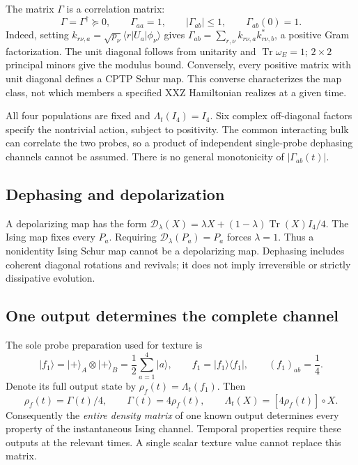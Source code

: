 \documentclass[11pt,a4paper]{article}
\newcommand{\ket}[1]{\lvert #1\rangle}
\newcommand{\bra}[1]{\langle #1\rvert}
\newcommand{\Tr}{\operatorname{Tr}}
\begin{document}
The matrix $\Gamma$ is a correlation matrix:
\begin{equation}
 \Gamma=\Gamma^\dagger\succeq0,\qquad \Gamma_{aa}=1,
 \qquad |\Gamma_{ab}|\le1,\qquad \Gamma_{ab}(0)=1.
 \label{eq:correlation}
\end{equation}
Indeed, setting $k_{r\nu,a}=\sqrt{p_\nu}\bra rU_a\ket{\phi_\nu}$
gives $\Gamma_{ab}=\sum_{r,\nu}k_{r\nu,a}k_{r\nu,b}^*$, a positive
Gram factorization. The unit diagonal follows from unitarity and
$\Tr\omega_E=1$; $2\times2$ principal minors give the modulus bound.
Conversely, every positive matrix with unit diagonal defines a CPTP
Schur map. This converse characterizes the map class, not which members
a specified XXZ Hamiltonian realizes at a given time.

All four populations are fixed and $\Lambda_t(I_4)=I_4$. Six complex
off-diagonal factors specify the nontrivial action, subject to positivity.
The common interacting bulk can correlate the two probes, so a product
of independent single-probe dephasing channels cannot be assumed.
There is no general monotonicity of $|\Gamma_{ab}(t)|$.

\subsection{Dephasing and depolarization}\label{sec:depolarizing}

A depolarizing map has the form
$\mathcal D_\lambda(X)=\lambda X+(1-\lambda)\Tr(X)I_4/4$.
The Ising map fixes every $P_a$. Requiring
$\mathcal D_\lambda(P_a)=P_a$ forces $\lambda=1$.
Thus a nonidentity Ising Schur map cannot be a depolarizing map.
Dephasing includes coherent diagonal rotations and revivals; it does
not imply irreversible or strictly dissipative evolution.

\subsection{One output determines the complete channel}
\label{sec:oneinput}

The sole probe preparation used for texture is
\begin{equation}
 \ket{f_1}=\ket+_A\otimes\ket+_B
 =\frac12\sum_{a=1}^4\ket a,\qquad
 f_1=\ket{f_1}\bra{f_1},\qquad (f_1)_{ab}=\frac14.
 \label{eq:f1}
\end{equation}
Denote its full output state by $\rho_f(t)=\Lambda_t(f_1)$. Then
\begin{equation}
 \boxed{\rho_f(t)=\Gamma(t)/4,\qquad
 \Gamma(t)=4\rho_f(t),\qquad
 \Lambda_t(X)=[4\rho_f(t)]\circ X.}
 \label{eq:reconstruction}
\end{equation}
Consequently the \emph{entire density matrix} of one known output
determines every property of the instantaneous Ising channel. Temporal
properties require these outputs at the relevant times. A single scalar
texture value cannot replace this matrix.
\end{document}
